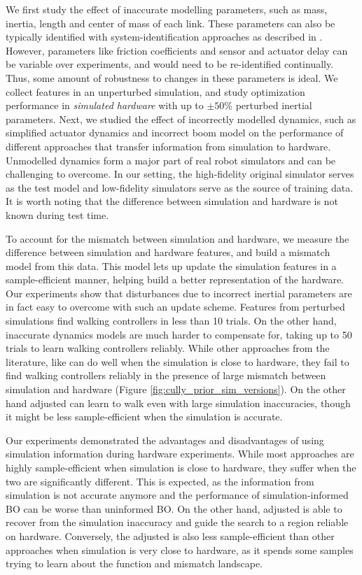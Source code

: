 We first study the effect of inaccurate modelling parameters, such as mass, inertia, length and center of mass of each link. These parameters can also be typically identified with system-identification approaches as described in \cite{An:1988:MCR:47324}. However, parameters like friction coefficients and sensor and actuator delay can be variable over experiments, and would need to be re-identified continually. Thus, some amount of robustness to changes in these parameters is ideal. We collect features in an unperturbed simulation, and study optimization performance in \textit{simulated hardware} with up to $\pm50\%$ perturbed inertial parameters. Next, we studied the effect of incorrectly modelled dynamics, such as simplified actuator dynamics and incorrect boom model on the performance of different approaches that transfer information from simulation to hardware. Unmodelled dynamics form a major part of real robot simulators and can be challenging to overcome. In our setting, the high-fidelity original simulator serves as the test model and low-fidelity simulators serve as the source of training data. It is worth noting that the difference between simulation and hardware is not known during test time.

To account for the mismatch between simulation and hardware, we measure the difference between simulation and hardware features, and build a mismatch model from this data. This model lets up update the simulation features in a sample-efficient manner, helping build a better representation of the hardware. Our experiments show that disturbances due to incorrect inertial parameters are in fact easy to overcome with such an update scheme. Features from perturbed simulations find walking controllers in less than 10 trials. On the other hand, inaccurate dynamics models are much harder to compensate for, taking up to 50 trials to learn walking controllers reliably. While other approaches from the literature, like \cite{cully2015robots} can do well when the simulation is close to hardware, they fail to find walking controllers reliably in the presence of large mismatch between simulation and hardware (Figure \ref{fig:cully_prior_sim_versions}). On the other hand adjusted \dogkernel can learn to walk even with large simulation inaccuracies, though it might be less sample-efficient when the simulation is accurate.

Our experiments demonstrated the advantages and disadvantages of using simulation information during hardware experiments. While most approaches are highly sample-efficient when simulation is close to hardware, they suffer when the two are significantly different. This is expected, as the information from simulation is not accurate anymore and the performance of simulation-informed BO can be worse than uninformed BO. On the other hand, adjusted \dogkernel is able to recover from the simulation inaccuracy and guide the search to a region reliable on hardware. Conversely, the adjusted \dogkernel is also less sample-efficient than other approaches when simulation is very close to hardware, as it spends some samples trying to learn about the function and mismatch landscape.

